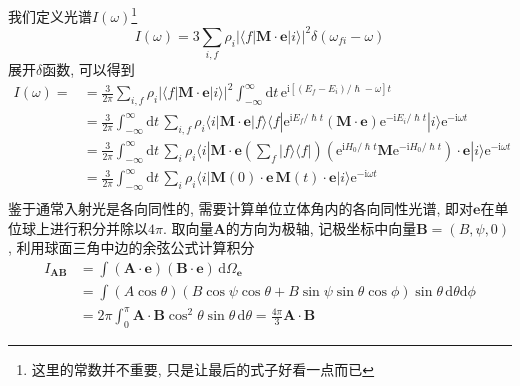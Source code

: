     我们定义光谱$I(\omega)$\footnote{这里的常数并不重要, 只是让最后的式子好看一点而已}
    \begin{equation}\label{eq:5-1}
        I(\omega) = 3 \sum_{i,f} \rho_i \left| \langle f|\bm{M} \cdot \bm{e}|i \rangle \right|^2 \delta(\omega_{fi} - \omega)
    \end{equation}
    展开$\delta$函数, 可以得到
    \begin{equation}\begin{aligned}
        I(\omega) = 
        &= \frac{3}{2\pi} \sum_{i,f} \rho_i \left| \langle f|\bm{M} \cdot \bm{e}|i \rangle \right|^2 \int_{-\infty}^{\infty} \mathrm{d}t\, \mathrm{e}^{\mathrm{i}\left[(E_f - E_i)/\hslash - \omega\right]t} \\
        &= \frac{3}{2\pi} \int_{-\infty}^{\infty} \mathrm{d}t\, \sum_{i,f} \rho_i \langle i|\bm{M} \cdot \bm{e}|f \rangle \langle f| \mathrm{e}^{\mathrm{i}E_f/\hslash t} \left(\bm{M} \cdot \bm{e}\right) \mathrm{e}^{-\mathrm{i}E_i/\hslash t} |i \rangle \mathrm{e}^{-\mathrm{i} \omega t} \\
        &= \frac{3}{2\pi} \int_{-\infty}^{\infty} \mathrm{d}t\, \sum_{i} \rho_i \langle i|\bm{M} \cdot \bm{e} \left(\sum_{f} |f \rangle \langle f| \right) \left( \mathrm{e}^{\mathrm{i}H_0/\hslash t} \bm{M} \mathrm{e}^{-\mathrm{i}H_0/\hslash t} \right) \cdot \bm{e}  |i \rangle \mathrm{e}^{-\mathrm{i} \omega t} \\
        &= \frac{3}{2\pi} \int_{-\infty}^{\infty} \mathrm{d}t\, \sum_{i} \rho_i \langle i|\bm{M}(0) \cdot \bm{e} \, \bm{M}(t) \cdot \bm{e} |i \rangle \mathrm{e}^{-\mathrm{i} \omega t} \\
    \end{aligned}\end{equation}
    鉴于通常入射光是各向同性的, 需要计算单位立体角内的各向同性光谱, 即对$\bm{e}$在单位球上进行积分并除以$4\pi$. 取向量$\bm{A}$的方向为极轴, 记极坐标中向量$\bm{B} = (B, \psi, 0)$, 利用球面三角中边的余弦公式计算积分
    \begin{equation}\begin{aligned}
        I_{\bm{AB}} 
        &= \int (\bm{A} \cdot \bm{e})(\bm{B} \cdot \bm{e}) \,\mathrm{d} \Omega_{\bm e}\\
        &= \int (A\cos\theta)(B\cos\psi\cos\theta + B\sin\psi\sin\theta\cos\phi ) \sin\theta \,\mathrm{d}\theta \mathrm{d}\phi\\
        &= 2\pi \int_0^{\pi}\bm{A}\cdot\bm{B}\cos^2\theta\sin\theta\,\mathrm{d}\theta
         = \frac{4\pi}{3}\bm{A}\cdot\bm{B}
    \end{aligned}\end{equation}
